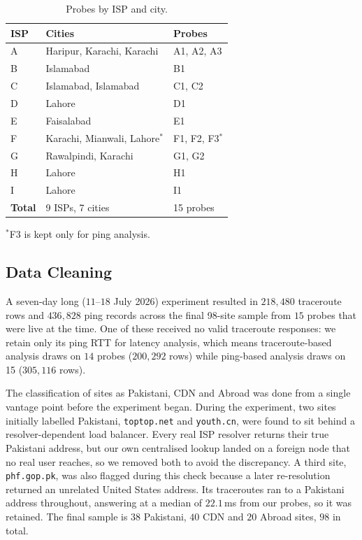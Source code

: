 \documentclass[sigconf,anonymous,10pt]{acmart}
\begin{document}
\begin{table}[t]
\caption{Probes by ISP and city.}
\label{tab:probes}
\footnotesize
\begin{tabular*}{\columnwidth}{@{\extracolsep{\fill}}lll}
\toprule
\textbf{ISP} & \textbf{Cities} & \textbf{Probes} \\
\midrule
A & Haripur, Karachi, Karachi & A1, A2, A3 \\
B & Islamabad                & B1 \\
C & Islamabad, Islamabad     & C1, C2 \\
D & Lahore                   & D1 \\
E & Faisalabad               & E1 \\
F & Karachi, Mianwali, Lahore$^*$ & F1, F2, F3$^*$ \\
G & Rawalpindi, Karachi      & G1, G2 \\
H & Lahore                   & H1 \\
I & Lahore                   & I1 \\
\midrule
\textbf{Total} & 9 ISPs, 7 cities & 15 probes \\
\bottomrule
\end{tabular*}
\smallskip
\raggedright
{\footnotesize $^*$F3 is kept only for ping analysis.}
\end{table}



\subsection{Data Cleaning}
\label{sec:cleaning}
A seven-day long ($11$–$18$ July 2026) experiment resulted in $218,480$ traceroute rows and $436,828$ ping records across the final 98-site sample from $15$ probes that were live at the time. One of these received no valid traceroute responses: we retain only its ping RTT for latency analysis, which means traceroute-based analysis draws on $14$ probes ($200,292$ rows) while ping-based analysis draws on 15 ($305,116$ rows).

The classification of sites as Pakistani, CDN and Abroad was done from a single vantage point before the experiment began. During the experiment, two sites initially labelled Pakistani, \texttt{toptop.net} and \texttt{youth.cn}, were found to sit behind a resolver-dependent load balancer. Every real ISP resolver returns their true Pakistani address, but our own centralised lookup landed on a foreign node that no real user reaches, so we removed both to avoid the discrepancy. A third site, \texttt{phf.gop.pk}, was also flagged during this check because a later re-resolution returned an unrelated United States address. Its traceroutes ran to a Pakistani address throughout, answering at a median of $22.1$\,ms from our probes, so it was retained. The final sample is $38$ Pakistani, $40$ CDN and $20$ Abroad sites, $98$ in total.
\end{document}
